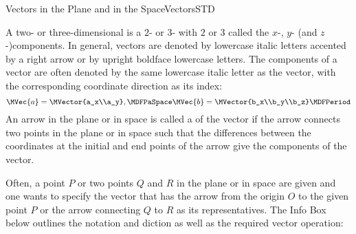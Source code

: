 \begin{MXContent}{Vectors in the Plane and in the Space}{Vectors}{STD}
\begin{MInfo}
A two- or three-dimensional  is a $2$- or $3$- with 
$2$ or $3$  called the $x$-, $y$- (and $z$-)components. 
In general, vectors are denoted by lowercase italic letters accented by a right arrow or 
by upright boldface lowercase letters. The components of a vector are often denoted by the same 
lowercase italic letter as the vector, with the corresponding coordinate direction as its index:
\[
 \MVec{a}=\MVector{a_x\\a_y},\MDFPaSpace \MVec{b}=\MVector{b_x\\b_y\\b_z}\MDFPeriod
\]
An arrow in the plane or in space is called a  of the 
vector if the arrow connects two points in the plane or in space such that the differences between the 
coordinates at the initial and end points of the 
arrow give the components of the vector. 
\end{MInfo}

Often, a point $P$ or two points $Q$ and $R$ in the plane or in space are given and one wants to specify the vector 
that has the arrow from the origin $O$ to the given point $P$ or the arrow connecting $Q$ to $R$ as its representatives. 
The Info Box below outlines the notation and diction as well as the required vector operation:



\end{MXContent}
